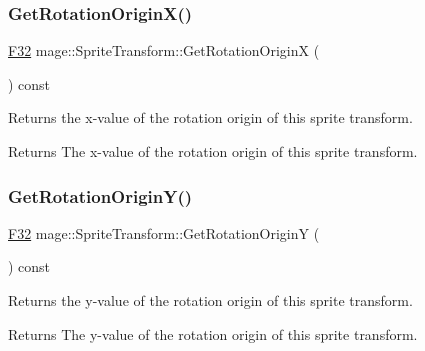 \subsubsection{\texorpdfstring{Get\+Rotation\+Origin\+X()}{GetRotationOriginX()}}
{\footnotesize\ttfamily \mbox{\hyperlink{namespacemage_aa97e833b45f06d60a0a9c4fc22ae02c0}{F32}} mage\+::\+Sprite\+Transform\+::\+Get\+Rotation\+OriginX (\begin{DoxyParamCaption}{ }\end{DoxyParamCaption}) const\hspace{0.3cm}{\ttfamily [noexcept]}}

Returns the x-\/value of the rotation origin of this sprite transform.

\begin{DoxyReturn}{Returns}
The x-\/value of the rotation origin of this sprite transform. 
\end{DoxyReturn}
\mbox{\label{classmage_1_1_sprite_transform_a762326097353f1303eede1b716cb9f51}} 
\subsubsection{\texorpdfstring{Get\+Rotation\+Origin\+Y()}{GetRotationOriginY()}}
{\footnotesize\ttfamily \mbox{\hyperlink{namespacemage_aa97e833b45f06d60a0a9c4fc22ae02c0}{F32}} mage\+::\+Sprite\+Transform\+::\+Get\+Rotation\+OriginY (\begin{DoxyParamCaption}{ }\end{DoxyParamCaption}) const\hspace{0.3cm}{\ttfamily [noexcept]}}

Returns the y-\/value of the rotation origin of this sprite transform.

\begin{DoxyReturn}{Returns}
The y-\/value of the rotation origin of this sprite transform. 
\end{DoxyReturn}
\mbox{\label{classmage_1_1_sprite_transform_a5dd81c8943599dc25952d8c62fb81252}} 
